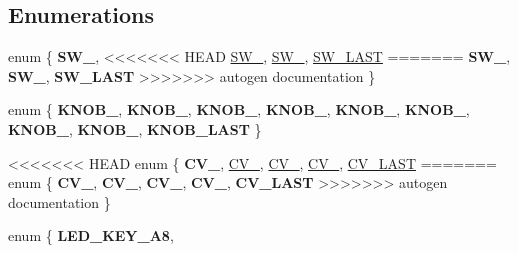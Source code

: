 \subsection*{Enumerations}
\begin{DoxyCompactItemize}
\item 
enum \{ {\bfseries S\+W\+\_}, 
<<<<<<< HEAD
\hyperlink{namespacedaisy_addc77b0887e2ab2d7341ab97015ce26fabd3e128a306f3ef06eaf46f189b0db76}{S\+W\+\_}, 
\hyperlink{namespacedaisy_addc77b0887e2ab2d7341ab97015ce26fa9348b017fbe9149d6d945705d3b5cb63}{S\+W\+\_}, 
\hyperlink{namespacedaisy_addc77b0887e2ab2d7341ab97015ce26fad28ab1e6a1609ca7d09b9ffd594ebde5}{S\+W\+\_\+\+L\+A\+ST}
=======
{\bfseries S\+W\+\_}, 
{\bfseries S\+W\+\_}, 
{\bfseries S\+W\+\_\+\+L\+A\+ST}
>>>>>>> autogen documentation
 \}
\item 
enum \{ \newline
{\bfseries K\+N\+O\+B\+\_}, 
{\bfseries K\+N\+O\+B\+\_}, 
{\bfseries K\+N\+O\+B\+\_}, 
{\bfseries K\+N\+O\+B\+\_}, 
\newline
{\bfseries K\+N\+O\+B\+\_}, 
{\bfseries K\+N\+O\+B\+\_}, 
{\bfseries K\+N\+O\+B\+\_}, 
{\bfseries K\+N\+O\+B\+\_}, 
\newline
{\bfseries K\+N\+O\+B\+\_\+\+L\+A\+ST}
 \}
\item 
<<<<<<< HEAD
enum \{ \newline
{\bfseries C\+V\+\_}, 
\hyperlink{namespacedaisy_a6be3271bd09db635a6318987eb086c07a19460cf285a94e9a6f292ff08649b5f8}{C\+V\+\_}, 
\hyperlink{namespacedaisy_a6be3271bd09db635a6318987eb086c07a2e5105b1853ba25676e68a668f9f7b08}{C\+V\+\_}, 
\hyperlink{namespacedaisy_a6be3271bd09db635a6318987eb086c07a1150d4e30b8d93e59da02a59c9f615aa}{C\+V\+\_}, 
\newline
\hyperlink{namespacedaisy_a6be3271bd09db635a6318987eb086c07a085d02d6cdf0f9a6b575f7c9dd3c6813}{C\+V\+\_\+\+L\+A\+ST}
=======
\mbox{\label{namespacedaisy_a6be3271bd09db635a6318987eb086c07}} 
enum \{ \newline
{\bfseries C\+V\+\_}, 
{\bfseries C\+V\+\_}, 
{\bfseries C\+V\+\_}, 
{\bfseries C\+V\+\_}, 
\newline
{\bfseries C\+V\+\_\+\+L\+A\+ST}
>>>>>>> autogen documentation
 \}
\item 
\mbox{\label{namespacedaisy_ac2ea4f8bee97384fa7bad670cc24aa30}} 
enum \{ \newline
{\bfseries L\+E\+D\+\_\+\+K\+E\+Y\+\_\+\+A8}, 

\end{DoxyCompactItemize}
